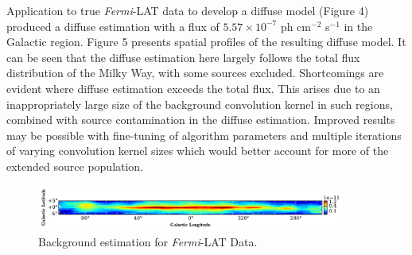 \documentclass{PoS}
\begin{document}
\begin{table}
\centering
{}
\makeatletter
\def\@captype{table}
\makeatother
\caption{Galactic Plane recovered diffuse fluxes}
\vspace{-20pt}
\end{table}

Application to true \textit{Fermi}-LAT data to develop a diffuse model (Figure 4) produced a diffuse estimation with a flux of $5.57 \times 10^{-7}$ ph cm$^{-2}$ s$^{-1}$ in the Galactic region. Figure 5 presents spatial profiles of the resulting diffuse model. It can be seen that the diffuse estimation here largely follows the total flux distribution of the Milky Way, with some sources excluded. Shortcomings are evident where diffuse estimation exceeds the total flux. This arises due to an inappropriately large size of the background convolution kernel in such regions, combined with source contamination in the diffuse estimation. Improved results may be possible with fine-tuning of algorithm parameters and multiple iterations of varying convolution kernel sizes which would better account for more of the extended source population.

\begin{figure}
  \begin{center}
      \includegraphics[width=0.9\textwidth]{figures/BG_DATA.pdf}
  \caption{Background estimation for \textit{Fermi}-LAT Data.}
  \end{center}
  \vspace{-15pt}
\end{figure}
\end{document}
